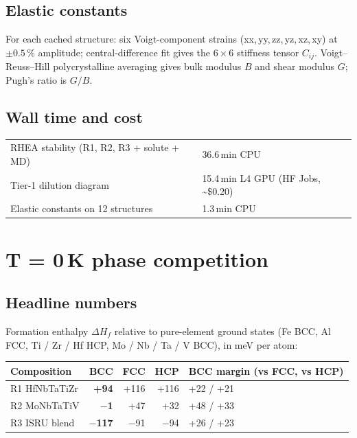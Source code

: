 \documentclass[11pt,a4paper]{article}
\begin{document}
\subsection{Elastic constants}

For each cached structure: six Voigt-component strains
(xx,\,yy,\,zz,\,yz,\,xz,\,xy) at $\pm 0.5\,\%$ amplitude; central-difference
fit gives the $6\times 6$ stiffness tensor $C_{ij}$. Voigt--Reuss--Hill
polycrystalline averaging gives bulk modulus $B$ and shear modulus $G$;
Pugh's ratio is $G/B$.

\subsection{Wall time and cost}

\begin{tabular}{ll}
\toprule
RHEA stability (R1, R2, R3 + solute + MD) & 36.6\,min CPU \\
Tier-1 dilution diagram & 15.4\,min L4 GPU (HF Jobs, \textasciitilde\$0.20)\\
Elastic constants on 12 structures & 1.3\,min CPU \\
\bottomrule
\end{tabular}

\section{T = 0\,K phase competition}
\label{sec:phases}

\subsection{Headline numbers}

Formation enthalpy $\Delta H_f$ relative to pure-element ground states (Fe BCC,
Al FCC, Ti / Zr / Hf HCP, Mo / Nb / Ta / V BCC), in meV per atom:

\begin{center}
\begin{tabular}{lrrrl}
\toprule
\textbf{Composition} & \textbf{BCC} & \textbf{FCC} & \textbf{HCP} &
\textbf{BCC margin (vs FCC, vs HCP)}\\
\midrule
R1 HfNbTaTiZr  & \cellcolor{bcc!20}\textbf{+94}  & +116 & +116 & +22 / +21 \\
R2 MoNbTaTiV   & \cellcolor{bcc!20}\textbf{$-$1} & +47  & +32  & +48 / +33 \\
R3 ISRU blend  & \cellcolor{bcc!20}\textbf{$-$117} & $-$91 & $-$94 & +26 / +23\\
\bottomrule
\end{tabular}
\end{center}
\end{document}
